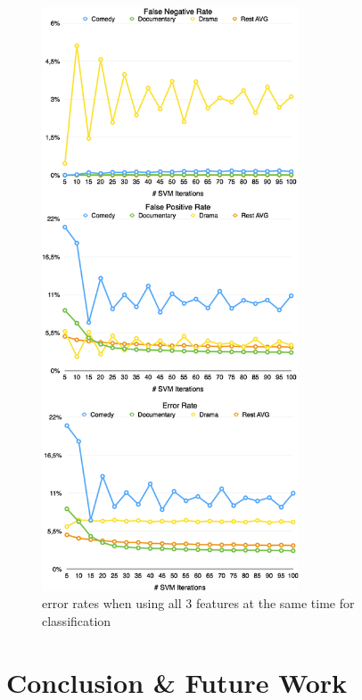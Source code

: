 \documentclass{vldb}
\begin{document}
\begin{figure}
\begin{center}
\includegraphics[width=3.00in]{ErrorRatesCombined.png}
\caption{error rates when using all 3 features at the same time for classification}
\label{fig:ErrorRatesCombined}
\end{center}
\end{figure}



\section{Conclusion \& Future Work}
\end{document}
